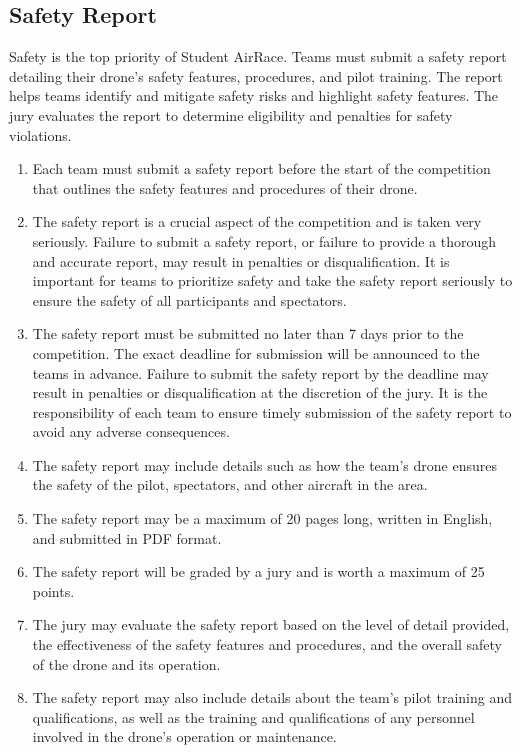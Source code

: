     \subsection{Safety Report}
    Safety is the top priority of Student AirRace. Teams must submit a safety report detailing their drone's safety features, procedures, and pilot training. The report helps teams identify and mitigate safety risks and highlight safety features. The jury evaluates the report to determine eligibility and penalties for safety violations.
    \begin{enumerate}
    \item Each team must submit a safety report before the start of the competition that outlines the safety features and procedures of their drone.
    \item The safety report is a crucial aspect of the competition and is taken very seriously. Failure to submit a safety report, or failure to provide a thorough and accurate report, may result in penalties or disqualification. It is important for teams to prioritize safety and take the safety report seriously to ensure the safety of all participants and spectators.
    \item The safety report must be submitted no later than 7 days prior to the competition. The exact deadline for submission will be announced to the teams in advance. Failure to submit the safety report by the deadline may result in penalties or disqualification at the discretion of the jury. It is the responsibility of each team to ensure timely submission of the safety report to avoid any adverse consequences.
    \item The safety report may include details such as how the team's drone ensures the safety of the pilot, spectators, and other aircraft in the area.
    \item The safety report may be a maximum of 20 pages long, written in English, and submitted in PDF format.
    \item The safety report will be graded by a jury and is worth a maximum of 25 points.
    \item The jury may evaluate the safety report based on the level of detail provided, the effectiveness of the safety features and procedures, and the overall safety of the drone and its operation.
    \item The safety report may also include details about the team's pilot training and qualifications, as well as the training and qualifications of any personnel involved in the drone's operation or maintenance.

\end{enumerate}
